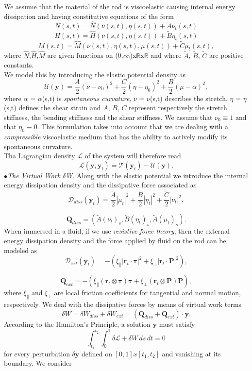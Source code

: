 \documentclass[12pt]{article}
\newcommand{\cB}{B}
\newcommand{\cA}{A}
\newcommand{\cC}{C}
\begin{document}
We assume that the material of the rod is viscoelastic causing internal energy dissipation and having constitutive equations of the form
\[  N (s,t)=  \hat{N}(\nu (s,t),\eta (s,t)) + \tilde{A} \nu_t (s,t)
\]
\[  H (s,t)=  \hat{H}(\nu (s,t),\eta (s,t)) + \tilde{B} \eta_t (s,t)
\]
\[  M (s,t)=  \hat{M}(\nu (s,t),\eta (s,t), \mu(s,t)) + \tilde{C} \mu_t (s,t),
\]
where $\hat{N}$,$\hat{H}$,$\hat{M}$ are given functions on (0,$\infty$)x$\mathbb{R}$x$\mathbb{R}$ and where $\tilde{A}$, $\tilde{B}$, $\tilde{C}$ are positive constants.
\\
We model this by introducing the elastic potential density  as
\[ \mathcal{U}(\mathbf{y}) = \frac{\cA}{2} (\nu - \nu_0)^2
+ \frac{\cC}{2} (\eta - \eta_0 )^2
+ \frac{\cB}{2} (\mu -\alpha)^2,
\]
where $\alpha$ = $\alpha$(s,t) is \emph{spontaneous curvature}, $\nu$ = $\nu$(s,t) describes the stretch, $\eta$ = $\eta$(s,t) defines the shear strain and $\cA$, $\cB$, $\cC$ represent respectively the stretch stiffness, the bending stiffness and the shear stiffness. We assume that $\nu_0\equiv1$ and that $\eta_0\equiv0$.
This formulation takes into account that we are dealing with a \emph{compressible} viscoelastic medium that has the ability to actively modify its spontaneous curvature.\\
Tha Lagrangian density $\mathcal{L}$ of the system will therefore read
\[ \mathcal{L}(\mathbf{y},\mathbf{y}_t)= \mathcal{T}(\mathbf{y}_t) - \mathcal{U}(\mathbf{y}).
\]
$\bullet$\emph{The Virtual Work $\delta$W}. Along with the elastic potential we introduce the internal energy dissipation density  and the dissipative force associated as 
\[ \mathcal{D}_{diss}(\mathbf{y}_t) = \frac{\tilde{A}}{2}\left|\mu_t\right|^2 + \frac{\tilde{B}}{2}\left|\eta_t\right|^2
+ \frac{\tilde{C}}{2}\left|\nu_t\right|^2,
\]

\[
\mathbf{Q}_{diss}= (\tilde{A}(\nu_t)_s,\tilde{B}(\eta_t)_s,\tilde{A}(\mu_t)_s).
\]
When immersed in a fluid, if we use \emph{resistive force theory},
then the external energy dissipation density and the force applied by fluid on the rod can be modeled as
\[ \mathcal{D}_{ext}(\mathbf{y}_t)= -(\xi_\parallel\left|\mathbf{r}_t\cdot\mathbf{\tau}\right|^2 + \xi_\perp \left|\mathbf{r}_t\cdot\mathbf{P}\right|^2),
\]

\[\mathbf{Q}_{ext} = -( \xi_\parallel (\mathbf{r}_t\otimes\mathbf{\tau})\mathbf{\tau} + \xi_\perp (\mathbf{r}_t\otimes\mathbf{P})\mathbf{P}),
\]
where $\xi_\parallel$ and $\xi_\perp$ are local friction coefficients for tangential and normal motion, respectively.
We deal with the dissipative forces by means of virtual work terms
\[\delta W = \delta W_{diss} + \delta W_{ext} = (\mathbf{Q}_{diss}+\mathbf{Q}_{ext})\cdot\mathbf{y}.
\]
According to the Hamilton's Principle, a solution $\mathbf{y}$ must satisfy
\[\int_{t_1}^{t_2} \int_{0}^{1} \delta \mathcal{L}+\delta W\, ds \, dt = 0
\]
for every perturbation $\delta \mathbf{y}$ defined on $[0,1]x[t_1,t_2]$ and vanishing at its boundary. We consider 
\end{document}
